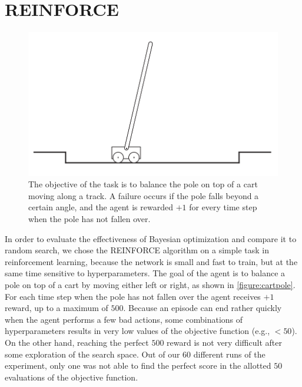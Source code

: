 \section{REINFORCE}
\label{section:experiments-empirical-bayes}

\begin{figure}[t]
	\begin{center}
		\includegraphics[width=1.0\textwidth]{images/cartpole.png}
		\caption{The objective of the task is to balance the pole on top of a cart moving along
			a track. A failure occurs if the pole falls beyond a certain angle, and the agent
			is rewarded $+1$ for every time step when the pole has not fallen over.}
		\label{figure:cartpole}
	\end{center}
\end{figure}

In order to evaluate the effectiveness of Bayesian optimization and compare it to random search, we chose the REINFORCE algorithm on a simple task in reinforcement learning, because the network is small and fast to train, but at the same time sensitive to hyperparameters. The goal of the agent is to balance a pole on top of a cart by moving either left or right, as shown in \autoref{figure:cartpole}. For each time step when the pole has not fallen over the agent receives $+1$ reward, up to a maximum of $500$. Because an episode can end rather quickly when the agent performs a few bad actions, some combinations of hyperparameters results in very low values of the objective function (e.g., $< 50$). On the other hand, reaching the perfect $500$ reward is not very difficult after some exploration of the search space. Out of our $60$ different runs of the experiment, only one was not able to find the perfect score in the allotted $50$ evaluations of the objective function.

